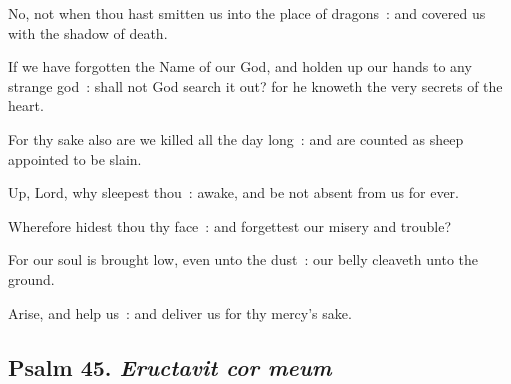 No, not when thou hast smitten us into the place of dragons~: and covered us with the shadow of death.\par
\clearpage
{}If we have forgotten the Name of our God, and holden up our hands to any strange god~: shall not God search it out? for he knoweth the very secrets of the heart.\par
{}For thy sake also are we killed all the day long~: and are counted as sheep appointed to be slain.\par
{}Up, Lord, why sleepest thou~: awake, and be not absent from us for ever.\par
{}Wherefore hidest thou thy face~: and forgettest our misery and trouble?\par
{}For our soul is brought low, even unto the dust~: our belly cleaveth unto the ground.\par
{}Arise, and help us~: and deliver us for thy mercy's sake.\par

\subsection{Psalm 45. \textit{Eructavit cor meum}}

